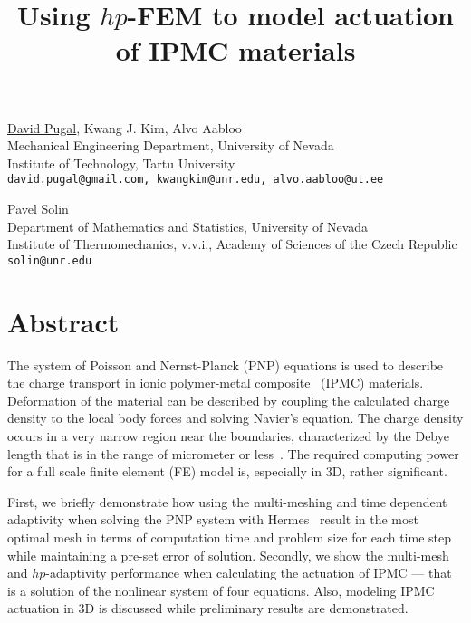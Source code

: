 \title{Using $hp$-FEM to model actuation of IPMC materials}
\author{} \institute{}
\maketitle

\begin{center}
{\large \underline{David Pugal}, Kwang J. Kim, Alvo Aabloo}\\
Mechanical Engineering Department, University of Nevada\\
Institute of Technology, Tartu University\\
{\tt david.pugal@gmail.com, kwangkim@unr.edu, alvo.aabloo@ut.ee}\\
\vspace{4mm}

{\large Pavel Solin}\\
Department of Mathematics and Statistics, University of Nevada\\
Institute of Thermomechanics, v.v.i., Academy of Sciences of the Czech Republic\\
{\tt solin@unr.edu}
\end{center}

\section*{Abstract}
The system of Poisson and Nernst-Planck (PNP) equations is used to describe the charge transport in ionic polymer-metal composite~\cite{shahinpoor2001} (IPMC) materials. Deformation of the material can be described by coupling the calculated charge density to the local body forces and solving Navier's equation. The charge density occurs in a very narrow region near the boundaries, characterized by the Debye length that is in the range of micrometer or less~\cite{bazant2004diffuse}. The required computing power for a full scale finite element (FE) model is, especially in 3D, rather significant.
  
First, we briefly demonstrate how using the multi-meshing and time dependent adaptivity when solving the PNP system with Hermes~\cite{Hermes-project} result in the most optimal mesh in terms of computation time and problem size for each time step while maintaining a pre-set error of solution. Secondly, we show the multi-mesh and $hp$-adaptivity performance when calculating the actuation of IPMC --- that is a solution of the nonlinear system of four equations. Also, modeling IPMC actuation in 3D is discussed while preliminary results are demonstrated.

